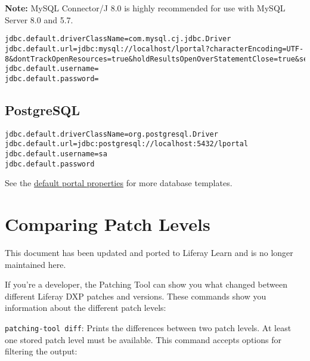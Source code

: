 \noindent\hrulefill

\textbf{Note:} MySQL Connector/J 8.0 is highly recommended for use with
MySQL Server 8.0 and 5.7.

\noindent\hrulefill

\begin{verbatim}
jdbc.default.driverClassName=com.mysql.cj.jdbc.Driver
jdbc.default.url=jdbc:mysql://localhost/lportal?characterEncoding=UTF-8&dontTrackOpenResources=true&holdResultsOpenOverStatementClose=true&serverTimezone=GMT&useFastDateParsing=false&useUnicode=true
jdbc.default.username=
jdbc.default.password=
\end{verbatim}

\section{PostgreSQL}\label{postgresql-2}

\begin{verbatim}
jdbc.default.driverClassName=org.postgresql.Driver
jdbc.default.url=jdbc:postgresql://localhost:5432/lportal
jdbc.default.username=sa
jdbc.default.password
\end{verbatim}

See the
\href{@platform-ref@/7.2-latest/propertiesdoc/portal.properties.html\#JDBC}{default
portal properties} for more database templates.

\chapter{Comparing Patch Levels}\label{comparing-patch-levels}

{This document has been updated and ported to Liferay Learn and is no
longer maintained here.}

If you're a developer, the Patching Tool can show you what changed
between different Liferay DXP patches and versions. These commands show
you information about the different patch levels:

\texttt{patching-tool\ diff}: Prints the differences between two patch
levels. At least one stored patch level must be available. This command
accepts options for filtering the output:

